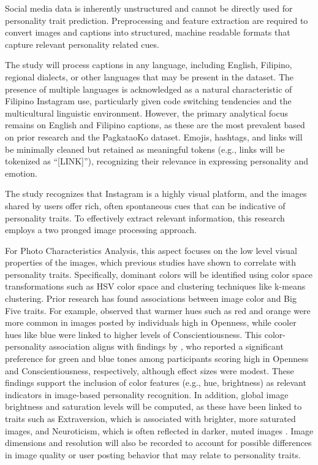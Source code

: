 	Social media data is inherently unstructured and cannot be directly used for personality trait prediction. Preprocessing and feature extraction are required to convert images and captions into structured, machine readable formats that capture relevant personality related cues.
	
	The study will process captions in any language, including English, Filipino, regional dialects, or other languages that may be present in the dataset. The presence of multiple languages is acknowledged as a natural characteristic of Filipino Instagram use, particularly given code switching tendencies and the multicultural linguistic environment. However, the primary analytical focus remains on English and Filipino captions, as these are the most prevalent based on prior research and the PagkataoKo dataset. Emojis, hashtags, and links will be minimally cleaned but retained as meaningful tokens (e.g., links will be tokenized as “[LINK]”), recognizing their relevance in expressing personality and emotion.
	
	The study recognizes that Instagram is a highly visual platform, and the images shared by users offer rich, often spontaneous cues that can be indicative of personality traits. To effectively extract relevant information, this research employs a two pronged image processing approach.
	
	For Photo Characteristics Analysis, this aspect focuses on the low level visual properties of the images, which previous studies have shown to correlate with personality traits. Specifically, dominant colors will be identified using color space transformations such as HSV color space and clustering techniques like k-means clustering. Prior research has found associations between image color and Big Five traits. For example, \cite{Branz2020} observed that warmer hues such as red and orange were more common in images posted by individuals high in Openness, while cooler hues like blue were linked to higher levels of Conscientiousness. This color-personality association aligns with findings by \cite{jue2022}, who reported a significant preference for green and blue tones among participants scoring high in Openness and Conscientiousness, respectively, although effect sizes were modest. These findings support the inclusion of color features (e.g., hue, brightness) as relevant indicators in image-based personality recognition. In addition, global image brightness and saturation levels will be computed, as these have been linked to traits such as Extraversion, which is associated with brighter, more saturated images, and Neuroticism, which is often reflected in darker, muted images \citep{Ferwerda2018}. Image dimensions and resolution will also be recorded to account for possible differences in image quality or user posting behavior that may relate to personality traits.
	
